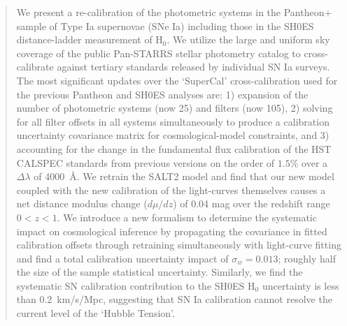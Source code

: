 \documentclass[twocolumn]{aastex63}
\begin{document}
\begin{abstract}
We present a re-calibration of the photometric systems in the Pantheon+ sample of Type Ia supernovae (SNe Ia) including those in the SH0ES distance-ladder measurement of H$_0$. We utilize the large and uniform sky coverage of the public Pan-STARRS stellar photometry catalog to cross-calibrate against tertiary standards released by individual SN Ia surveys. The most significant updates over the `SuperCal'  cross-calibration used for the previous Pantheon and SH0ES analyses are: 1) expansion of the number of photometric systems (now 25) and filters (now 105), 2) solving for all filter offsets in all systems simultaneously to produce a calibration uncertainty covariance matrix for cosmological-model constraints, and 3) accounting for the change in the fundamental flux calibration of the HST CALSPEC standards from previous versions on the order of $1.5\%$ over a $\Delta \lambda$ of 4000~\AA. We retrain the SALT2 model and find that our new model coupled with the new calibration of the light-curves themselves causes a net distance modulus change ($d\mu/dz$) of 0.04 mag over the redshift range $0<z<1$. We introduce a new formalism to determine the systematic impact on cosmological inference by propagating the covariance in fitted calibration offsets through retraining simultaneously with light-curve fitting and find a total calibration uncertainty impact of $\sigma_w=0.013$; roughly half the size of the sample statistical uncertainty.  Similarly, we find the systematic SN calibration contribution to the SH0ES H$_0$ uncertainty is less than 0.2~km/s/Mpc, suggesting that SN Ia calibration cannot resolve the current level of the `Hubble Tension'.

\end{abstract}
\end{document}
